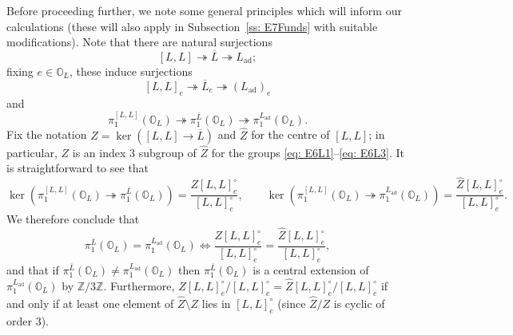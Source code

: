 \documentclass[11pt]{amsart}
\renewcommand{\O}{{\mathbb O}}
\newcommand{\bZ}{{\mathbb Z}}
\newcommand{\ad}{{\operatorname{ad}}}
\numberwithin{equation}{section}
\begin{document}
	Before proceeding further, we note some general principles which will inform our calculations (these will also apply in Subsection~\ref{ss: E7Funds} with suitable modifications). Note that there are natural surjections $$[L,L]\twoheadrightarrow \overline{L}\twoheadrightarrow L_\ad;$$ fixing $e\in\O_L$, these induce surjections $$[L,L]_e\twoheadrightarrow \overline{L}_e\twoheadrightarrow (L_\ad)_e$$ and 
	$$\pi_1^{[L,L]}(\O_L)\twoheadrightarrow \pi_1^{\overline{L}}(\O_L)\twoheadrightarrow \pi_1^{L_\ad}(\O_L).$$
	Fix the notation $Z=\ker([L,L]\to \overline{L})$ and $\widehat{Z}$ for the centre of $[L,L]$; in particular, $Z$ is an index 3 subgroup of $\widehat{Z}$ for the groups \eqref{eq: E6L1}--\eqref{eq: E6L3}. It is straightforward to see that %
	$$\ker\left(\pi_1^{[L,L]}(\O_L)\twoheadrightarrow \pi_1^{\overline{L}}(\O_L)\right)= \frac{Z[L,L]_e^\circ }{[L,L]_e^\circ},\qquad \ker\left(\pi_1^{[L,L]}(\O_L)\twoheadrightarrow \pi_1^{L_\ad}(\O_L)\right)= \frac{\widehat{Z}[L,L]_e^\circ}{[L,L]_e^\circ}.$$
	We therefore conclude that $$\pi_1^{\overline{L}}(\O_L)=\pi_1^{L_\ad}(\O_L) \iff \frac{Z [L,L]_e^\circ}{[L,L]_e^\circ}=\frac{\widehat{Z}[L,L]_e^\circ}{[L,L]_e^\circ},$$
	and that if $\pi_1^{\overline{L}}(\O_L)\neq\pi_1^{L_\ad}(\O_L)$ then $\pi_1^{\overline{L}}(\O_L)$ is a central extension of $\pi_1^{L_\ad}(\O_L)$ by $\bZ/3\bZ$. Furthermore, $Z[L,L]_e^\circ /[L,L]_e^\circ=\widehat{Z}[L,L]_e^\circ /[L,L]_e^\circ$ if and only if at least one element of $\widehat{Z}\setminus Z$ lies in $[L,L]_e^\circ$ (since $\widehat{Z}/Z$ is cyclic of order 3).
	
	
\end{document}
